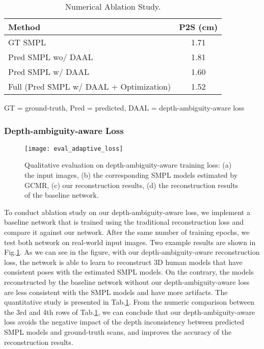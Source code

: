 \begin{table}
	\caption{Numerical Ablation Study.  }
	\centering
	\begin{threeparttable}
	\begin{tabular}{lc}
		\toprule
		Method\tnote{} & P2S (cm)   \\
		\midrule
		GT SMPL & 1.71 \\
		Pred SMPL wo/ DAAL& 1.81 \\
		Pred SMPL w/ DAAL& 1.60\\
		Full (Pred SMPL w/ DAAL + Optimization) &  1.52 \\
		\bottomrule
	\end{tabular}
	\begin{tablenotes}
	   \scriptsize
       \item[] GT = ground-truth, Pred = predicted, DAAL = depth-ambiguity-aware loss
     \end{tablenotes}
    \end{threeparttable}
	\label{tab:quant_evalation}
\end{table}

\subsubsection{Depth-ambiguity-aware Loss}


\begin{figure}
	\begin{center}
		\texttt{[image: eval\_adaptive\_loss]}
	\end{center}
	\caption{Qualitative evaluation on depth-ambiguity-aware training loss: (a) the input images, (b) the corresponding SMPL models estimated by GCMR, (c) our reconstruction results, (d) the reconstruction results of the baseline network. }
	\label{fig:eval_adaptive_loss}
\end{figure}



To conduct ablation study on our depth-ambiguity-aware loss, we implement a baseline network that is trained using the traditional reconstruction loss and compare it against our network.  After the same number of training epochs, we test both network on real-world input images. Two example results are shown in Fig.\ref{fig:eval_adaptive_loss}. As we can see in the figure, with our depth-ambiguity-aware reconstruction loss, the network is able to learn to reconstruct 3D human models that have consistent poses with the estimated SMPL models. On the contrary, the models reconstructed by the baseline network without our depth-ambiguity-aware loss are less consistent with the SMPL models and have more artifacts. The quantitative study is presented in Tab.\ref{tab:quant_evalation}. From the numeric comparison between the 3rd and 4th rows of Tab.\ref{tab:quant_evalation}, we can conclude that our  depth-ambiguity-aware loss avoids the negative impact of the depth inconsistency between predicted SMPL models and ground-truth scans, and improves the accuracy of the reconstruction results. 

